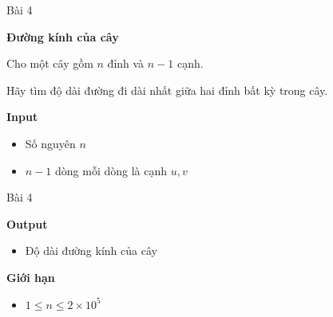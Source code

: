 \begin{frame}{Bài 4}

\begin{center}
\textbf{Đường kính của cây}
\end{center}

{\small
Cho một cây gồm $n$ đỉnh và $n-1$ cạnh.

Hãy tìm độ dài đường đi dài nhất giữa hai đỉnh bất kỳ trong cây.
}

\vspace{0.3cm}

\textbf{Input}
\begin{itemize}
\item Số nguyên $n$
\item $n-1$ dòng mỗi dòng là cạnh $u, v$
\end{itemize}

\end{frame}

\begin{frame}{Bài 4}

\textbf{Output}
\begin{itemize}
\item Độ dài đường kính của cây
\end{itemize}

\vspace{0.3cm}

\textbf{Giới hạn}
\begin{itemize}
\item $1 \le n \le 2 \times 10^5$
\end{itemize}

\end{frame}

